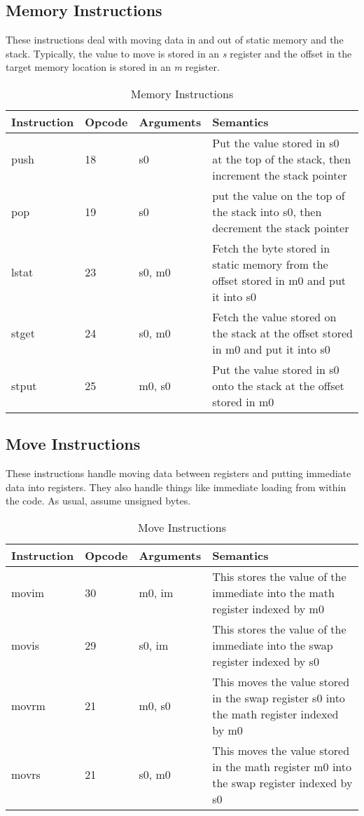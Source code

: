 \subsection{Memory Instructions}
These instructions deal with moving data in and out of static memory and the
stack. Typically, the value to move is stored in an \emph{s} register and the
offset in the target memory location is stored in an \emph{m} register.
\begin{table}[h!]
	\centering
	\caption{Memory Instructions}
	\begin{tabular}{|l|l|l|p{8cm}|}
		\hline
		Instruction & Opcode & Arguments & Semantics \\\hline
		       push & 18 & s0 & Put the value stored in s0 at the top of the stack, then 
		increment the stack pointer \\\hline
		pop & 19 & s0 & put the value on the top of the stack into s0, then decrement 
		the stack pointer\\\hline
lstat & 23 & s0, m0 & Fetch the byte stored in static memory from the offset stored in m0 and put it into
		s0 \\\hline
		stget & 24 & s0, m0 & Fetch the value stored on the stack at the offset stored in
		m0 and put it into s0 \\\hline
		stput & 25 & m0, s0 & Put the value stored in s0 onto the stack at the offset stored
		in m0\\\hline
	\end{tabular}
\end{table}

\clearpage
\subsection{Move Instructions}
These instructions handle moving data between registers and putting immediate
data into registers. They also handle things like immediate loading from within
the code. As usual, assume unsigned bytes.
\begin{table}[h!]
	\centering
	\caption{Move Instructions}
	\begin{tabular}{|l|l|l|p{8cm}|}
		\hline
		Instruction & Opcode & Arguments & Semantics \\\hline
		      movim & 30 & m0, im & This stores the value of the immediate into the math register
		indexed by m0 \\\hline
		movis & 29 & s0, im & This stores the value of the immediate into the swap register
		indexed by s0 \\\hline
		movrm & 21 & m0, s0 & This moves the value stored in the swap register s0 into the 
		math register indexed by m0 \\\hline
		movrs & 21 & s0, m0 & This moves the value stored in the math register m0 into the 
		swap register indexed by s0 \\\hline
	\end{tabular}
\end{table}

